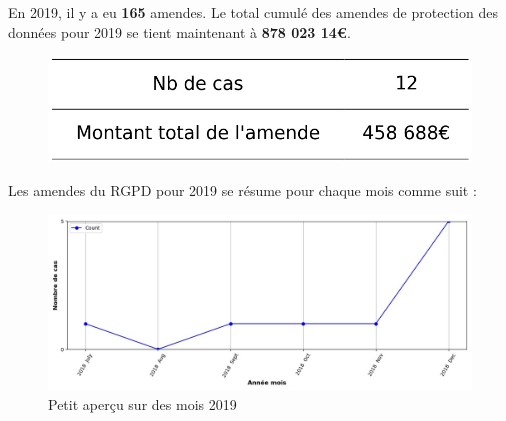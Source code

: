 \documentclass[french]{article}
\begin{document}
	\begin{multicols}{2}
	
	En 2019,  il y a eu \textbf{165} amendes.
	Le total cumulé des amendes de protection des données pour 2019 se tient maintenant à \textbf{878 023 14€}.
	
	\begin{figure}[H]
	\centering\includegraphics[width=1\linewidth]{graphs/counter_year}
	\end{figure}


	Les amendes du RGPD pour 2019 se résume pour chaque mois comme suit :

	\begin{figure}
	[H]\centering\includegraphics[width = 1.2\linewidth]{graphs/NbFinesPerMonth_year_graph}
	\caption{Petit aperçu sur des mois 2019}
	\end{figure}

	\end{multicols}
\end{document}
